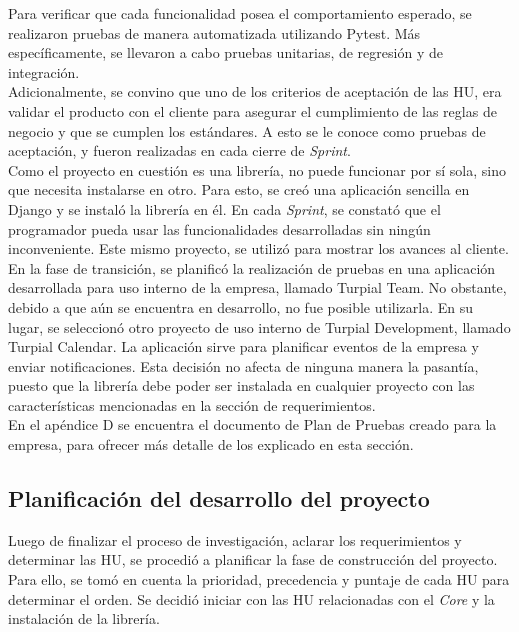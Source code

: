 Para verificar que cada funcionalidad posea el comportamiento esperado, se realizaron pruebas de manera automatizada utilizando Pytest. Más específicamente, se llevaron a cabo pruebas unitarias, de regresión y de integración. \\

Adicionalmente, se convino que uno de los criterios de aceptación de las HU, era validar el producto con el cliente para asegurar el cumplimiento de las reglas de negocio y que se cumplen los estándares. A esto se le conoce como pruebas de aceptación, y fueron realizadas en cada cierre de \textit{Sprint}.\\


Como el proyecto en cuestión es una librería, no puede funcionar por sí sola, sino que necesita instalarse en otro. Para esto, se creó una aplicación sencilla en Django y se instaló la librería en él. En cada \textit{Sprint}, se constató que el programador pueda usar las funcionalidades desarrolladas  sin ningún inconveniente. Este mismo proyecto, se utilizó para mostrar los avances al cliente. \\

En la fase de transición, se planificó la realización de pruebas en una aplicación desarrollada para uso interno de la empresa, llamado Turpial Team. No obstante, debido a que aún se encuentra en desarrollo, no fue posible utilizarla. En su lugar, se seleccionó otro proyecto de uso interno de Turpial Development, llamado Turpial Calendar. La aplicación sirve para planificar eventos de la empresa y enviar notificaciones. Esta decisión no afecta de ninguna manera la pasantía, puesto que la librería debe poder ser instalada en cualquier proyecto con las características mencionadas en la sección de requerimientos.\\

En el apéndice D se encuentra el documento de Plan de Pruebas creado para la empresa, para ofrecer más detalle de los explicado en esta sección.\\

\subsection{Planificación del desarrollo del proyecto}

Luego de finalizar el proceso de investigación, aclarar los requerimientos y determinar las HU, se procedió a planificar la fase de construcción del proyecto. Para ello, se tomó en cuenta la prioridad, precedencia y puntaje de cada HU para determinar el orden. Se decidió iniciar con las HU relacionadas con el \textit{Core} y la instalación de la librería.\\

